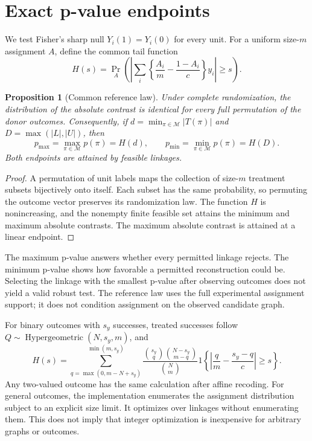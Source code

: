 \documentclass[11pt]{article}
\newtheorem{proposition}{Proposition}
\newcommand{\M}{\mathcal M}
\newcommand{\PrA}{\Pr_A}
\begin{document}
\section{Exact p-value endpoints}
We test Fisher's sharp null $Y_i(1)=Y_i(0)$ for every unit. For a uniform size-$m$
assignment $A$, define the common tail function
\[
 H(s)=\PrA\left(\left|\sum_i\left\{\frac{A_i}{m}-\frac{1-A_i}{c}\right\}y_i\right|
 \ge s\right).
\]
\begin{proposition}[Common reference law]
Under complete randomization, the distribution of the absolute contrast is identical
for every full permutation of the donor outcomes. Consequently, if
$d=\min_{\pi\in\M}|T(\pi)|$ and $D=\max(|L|,|U|)$, then
\[
 p_{\max}=\max_{\pi\in\M}p(\pi)=H(d),\qquad
 p_{\min}=\min_{\pi\in\M}p(\pi)=H(D).
\]
Both endpoints are attained by feasible linkages.
\end{proposition}
\begin{proof}
A permutation of unit labels maps the collection of size-$m$ treatment subsets bijectively
onto itself. Each subset has the same probability, so permuting the outcome vector
preserves its randomization law. The function $H$ is nonincreasing, and the nonempty
finite feasible set attains the minimum and maximum absolute contrasts. The maximum
absolute contrast is attained at a linear endpoint.
\end{proof}

The maximum p-value answers whether every permitted linkage rejects. The minimum
p-value shows how favorable a permitted reconstruction could be. Selecting the linkage
with the smallest p-value after observing outcomes does not yield a valid robust test.
The reference law uses the full experimental assignment support; it does not condition
assignment on the observed candidate graph.

For binary outcomes with $s_y$ successes, treated successes follow
$Q\sim\operatorname{Hypergeometric}(N,s_y,m)$, and
\[
 H(s)=\sum_{q=\max(0,m-N+s_y)}^{\min(m,s_y)}
 \frac{\binom{s_y}{q}\binom{N-s_y}{m-q}}{\binom Nm}
 1\left\{\left|\frac q m-\frac{s_y-q}{c}\right|\ge s\right\}.
\]
Any two-valued outcome has the same calculation after affine recoding. For general
outcomes, the implementation enumerates the assignment distribution subject to an
explicit size limit. It optimizes over linkages without enumerating them. This does
not imply that integer optimization is inexpensive for arbitrary graphs or outcomes.
\end{document}
